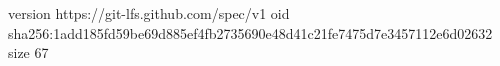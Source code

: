 version https://git-lfs.github.com/spec/v1
oid sha256:1add185fd59be69d885ef4fb2735690e48d41c21fe7475d7e3457112e6d02632
size 67
